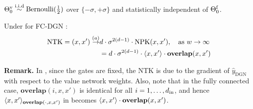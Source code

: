 \begin{assumption}\label{assmp:main}
${\Theta}^{\text{v}}_0\stackrel{\text{i.i.d}}\sim\text{Bernoulli}(\frac12)$ over $\{-{\sigma},+{\sigma}\}$ and statistically independent of $\Theta^{\textrm{f}}_0$.
\end{assumption}

\begin{theorem}
\label{th:fcprev} Under  for FC-DGN : 
\begin{align*}
\text{NTK}=(x,x') \stackrel{(a)}\rightarrow &d \cdot \sigma^{2(d-1)} \cdot \text{NPK}(x,x'), \quad\text{as}\,\, w\rightarrow \infty \\
					     & = d \cdot \sigma^{2(d-1)}\cdot\langle x,x'\rangle\cdot \textbf{overlap}(x,x')
\end{align*}
\end{theorem} 
\textbf{Remark.} In , since the gates are fixed, the NTK is due to the gradient of $\hat{y}_{\text{DGN}}$ with respect to the value network weights. Also, note that in the fully connected case, $\textbf{overlap}(i,x,x')$ is identical for all $i=1,\ldots,d_{\text{in}}$, and hence $\langle x,x'\rangle_{\textbf{overlap}(\cdot,x,x')}$ in  becomes $\langle x,x'\rangle\cdot \textbf{overlap}(x,x')$.
